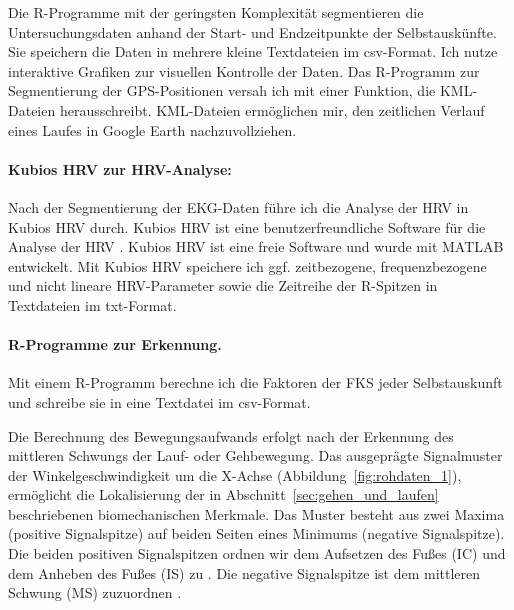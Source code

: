 \label{par:r_programme_zur_segmentierung}

Die R-Programme mit der geringsten Komplexität segmentieren die Untersuchungsdaten anhand der Start- und Endzeitpunkte der Selbstauskünfte. Sie speichern die Daten in mehrere kleine Textdateien im \acs{csv}-Format. Ich nutze interaktive Grafiken zur visuellen Kontrolle der Daten. Das R-Programm zur Segmentierung der \acs{GPS}-Positionen versah ich mit einer Funktion, die \acs{KML}-Dateien herausschreibt. \acs{KML}-Dateien ermöglichen mir, den zeitlichen Verlauf eines Laufes in Google Earth nachzuvollziehen.

\paragraph{Kubios \ac{HRV} zur \ac{HRV}-Analyse:} 

\label{par:kubios_hrv_zur_hrv_analyse}

Nach der Segmentierung der \ac{EKG}-Daten führe ich die Analyse der \ac{HRV} in Kubios \ac{HRV} durch. Kubios \ac{HRV} ist eine benutzerfreundliche Software für die Analyse der \ac{HRV} \citep{Tarvainen2014}. Kubios \ac{HRV} ist eine freie Software und wurde mit MATLAB entwickelt. Mit Kubios \ac{HRV} speichere ich ggf. zeitbezogene, frequenzbezogene und nicht lineare \ac{HRV}-Parameter sowie die Zeitreihe der R-Spitzen in Textdateien im txt-Format.

\paragraph{R-Programme zur Erkennung.} 

\label{par:r_programme_zur_erkennung}

Mit einem R-Programm berechne ich die Faktoren der \ac{FKS} jeder Selbstauskunft und schreibe sie in eine Textdatei im \acs{csv}-Format.

Die Berechnung des Bewegungsaufwands erfolgt nach der Erkennung des mittleren Schwungs der Lauf- oder Gehbewegung. Das ausgeprägte Signalmuster der Winkelgeschwindigkeit um die X-Achse (Abbildung~\ref{fig:rohdaten_1}), ermöglicht die Lokalisierung der in Abschnitt~\ref{sec:gehen_und_laufen} beschriebenen biomechanischen Merkmale. Das Muster besteht aus zwei Maxima (positive Signalspitze) auf beiden Seiten eines Minimums (negative Signalspitze). Die beiden positiven Signalspitzen ordnen wir dem Aufsetzen des Fußes (\ac{IC}) und dem Anheben des Fußes (\ac{IS}) zu \citep{Aminian2002}. Die negative Signalspitze ist dem mittleren Schwung (\ac{MS}) zuzuordnen \citep{Aminian2002}.

